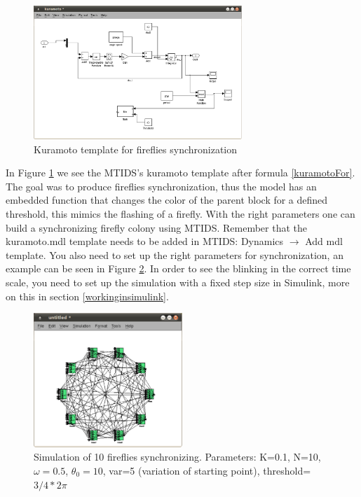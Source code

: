 \documentclass[a4paper,twoside, openright,12pt]{report}
\begin{document}
\begin{figure}[htb]
\centering
\includegraphics[width=0.7\textwidth]{pics/screenKuramoto.eps}
\caption[MTIDS Kuramoto Template]{Kuramoto template for fireflies synchronization}
\label{templateKuramotoFig}
\end{figure}
 
In Figure \ref{templateKuramotoFig} we see  the MTIDS's kuramoto template after formula \ref{kuramotoFor}. The goal was to produce fireflies synchronization, thus
the model has an embedded function that changes the color of the parent block for a defined threshold, this mimics the flashing of a firefly.
With the right parameters one can build a synchronizing firefly colony using MTIDS. Remember that the kuramoto.mdl template needs to be added in MTIDS:
Dynamics $\rightarrow$ Add mdl template. You also need to set up the right parameters for synchronization, an example can be seen in Figure \ref{syncFig}.
In order to see the blinking in the correct time scale, you need to set up the simulation with a fixed step size in Simulink, more on this in section 
\ref{workinginsimulink}.



\begin{figure}[htb]
\centering
\includegraphics[width=0.5\textwidth]{pics/screenfireflies.eps}
\caption[MTIDS fireflies synchronization]{Simulation of 10 fireflies synchronizing. Parameters: K=0.1, N=10, $\omega=0.5$, $\theta_0=10$, var=5 (variation of starting point), threshold= $3/4*2\pi$}
\label{syncFig}
\end{figure}
\end{document}
